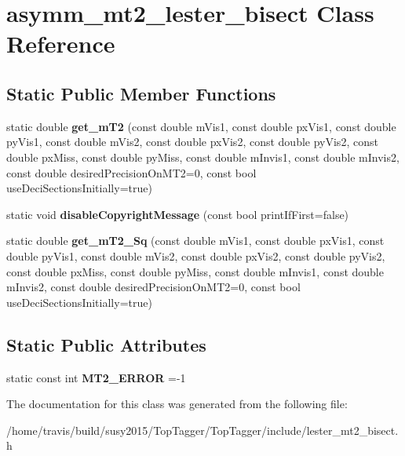\hypertarget{classasymm__mt2__lester__bisect}{\section{asymm\-\_\-mt2\-\_\-lester\-\_\-bisect Class Reference}
\label{classasymm__mt2__lester__bisect}
}
\subsection*{Static Public Member Functions}
\begin{DoxyCompactItemize}
\item 
\hypertarget{classasymm__mt2__lester__bisect_a13110c1f7824a39e18c2ee9ecea5909e}{static double {\bfseries get\-\_\-m\-T2} (const double m\-Vis1, const double px\-Vis1, const double py\-Vis1, const double m\-Vis2, const double px\-Vis2, const double py\-Vis2, const double px\-Miss, const double py\-Miss, const double m\-Invis1, const double m\-Invis2, const double desired\-Precision\-On\-M\-T2=0, const bool use\-Deci\-Sections\-Initially=true)}\label{classasymm__mt2__lester__bisect_a13110c1f7824a39e18c2ee9ecea5909e}

\item 
\hypertarget{classasymm__mt2__lester__bisect_a01fd3fe6227bf51b1c589e150670d849}{static void {\bfseries disable\-Copyright\-Message} (const bool print\-If\-First=false)}\label{classasymm__mt2__lester__bisect_a01fd3fe6227bf51b1c589e150670d849}

\item 
\hypertarget{classasymm__mt2__lester__bisect_a6a5aa8b70f0ee049609a07890bdff1e9}{static double {\bfseries get\-\_\-m\-T2\-\_\-\-Sq} (const double m\-Vis1, const double px\-Vis1, const double py\-Vis1, const double m\-Vis2, const double px\-Vis2, const double py\-Vis2, const double px\-Miss, const double py\-Miss, const double m\-Invis1, const double m\-Invis2, const double desired\-Precision\-On\-M\-T2=0, const bool use\-Deci\-Sections\-Initially=true)}\label{classasymm__mt2__lester__bisect_a6a5aa8b70f0ee049609a07890bdff1e9}

\end{DoxyCompactItemize}
\subsection*{Static Public Attributes}
\begin{DoxyCompactItemize}
\item 
\hypertarget{classasymm__mt2__lester__bisect_a0686f7e583fcb2c86ab5638837b1f318}{static const int {\bfseries M\-T2\-\_\-\-E\-R\-R\-O\-R} =-\/1}\label{classasymm__mt2__lester__bisect_a0686f7e583fcb2c86ab5638837b1f318}

\end{DoxyCompactItemize}


The documentation for this class was generated from the following file\-:\begin{DoxyCompactItemize}
\item 
/home/travis/build/susy2015/\-Top\-Tagger/\-Top\-Tagger/include/lester\-\_\-mt2\-\_\-bisect.\-h\end{DoxyCompactItemize}
